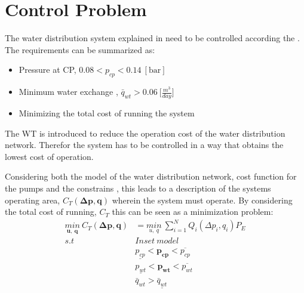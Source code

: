 \section{Control Problem}
\label{control_problem}

The water distribution system explained in  need to be controlled according the . The requirements can be summarized as: 

\begin{itemize}
	\item Pressure at CP, $0.08 < p_{cp} < 0.14 \:[\text{bar}]$
%
	\item Minimum water exchange , $\bar{q}_{wt} > 0.06 \: \big[\frac{m^3}{day}\big]$
%
	\item Minimizing the total cost of running the system
\end{itemize}

The WT is introduced to reduce the operation cost of the water distribution network. Therefor the system has to be controlled in a way that obtains the lowest cost of operation. 

Considering both the model of the water distribution network, cost function for the pumps and the constrains , this leads to a description of the systems operating area, $C_T(\pmb{\Delta{p}},\pmb{q})$ wherein the system must operate. By considering the total cost of running, $C_T$ this can be seen as a minimization problem:
\begin{align*}
\underset{\pmb{u}, \:\pmb{q}}{min} \: C_T(\pmb{\Delta{p}},\pmb{q}) &= \underset{u, \:q}{min} \: \sum_{i=1}^{N} Q_i(\Delta{p}_i,q_i) P_E  \\
%
s.t \:\:\:\:\: & Inset \:model \\
%
& \underline{p_{cp}} < \pmb{p_{cp}} < \overline{p_{cp}} \\
%
& \underline{p_{wt}} < \pmb{p_{wt}} < \overline{p_{wt}} \\
%
& \bar{q}_{wt} > \underline{\bar{q}_{wt}}
\end{align*}


